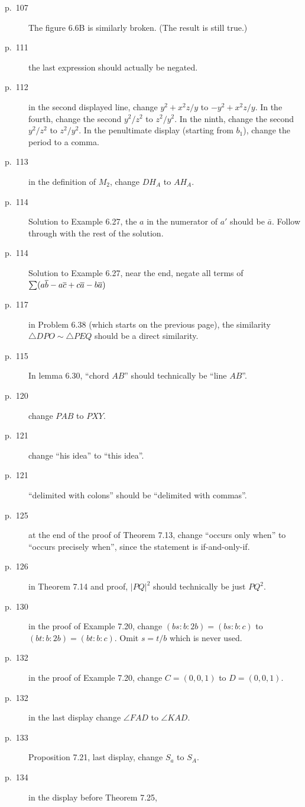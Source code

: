 \documentclass[11pt]{scrartcl}
\begin{document}
\begin{description}
\item[p.\  107] 
  The figure 6.6B is similarly broken.
  (The result is still true.)
\item[p.\  111] the last expression should actually be negated.
\item[p.\  112] in the second displayed line, change $y^2+x^2z/y$ to $-y^2+x^2z/y$.
  In the fourth, change the second $y^2/z^2$ to $z^2/y^2$.
  In the ninth, change the second $y^2/z^2$ to $z^2/y^2$.
  In the penultimate display (starting from $b_1$), change the period to a comma.
\item[p.\  113] in the definition of $M_2$, change $DH_A$ to $AH_A$.
\item[p.\  114] Solution to Example 6.27, the $a$ in the numerator of $a'$ should be $\bar a$.
  Follow through with the rest of the solution.
\item[p.\  114] Solution to Example 6.27, near the end, negate all terms of
  $\sum (a \overline b - a \overline c + c \overline a - b \overline a)$
\item[p.\  117] in Problem 6.38 (which starts on the previous page), the similarity
  $\triangle DPO \sim \triangle PEQ$ should be a direct similarity.
\item[p.\ 115] In lemma 6.30, ``chord $AB$'' should technically be ``line $AB$''.
\item[p.\  120] change $PAB$ to $PXY$.
\item[p.\  121] change ``his idea'' to ``this idea''.
\item[p.\  121] ``delimited with colons'' should be
  ``delimited with commas''.
\item[p.\  125] at the end of the proof of Theorem 7.13,
  change ``occurs only when'' to ``occurs precisely when'',
  since the statement is if-and-only-if.
\item[p.\  126] in Theorem 7.14 and proof, $|PQ|^2$ should technically be just $PQ^2$.
\item[p.\  130] in the proof of Example 7.20, change $(bs:b:2b)=(bs:b:c)$ to $(bt:b:2b)=(bt:b:c)$.
  Omit $s=t/b$ which is never used.
\item[p.\  132] in the proof of Example 7.20, change $C = (0, 0, 1)$ to $D = (0, 0, 1)$.
\item[p.\  132] in the last display change $\angle FAD$ to $\angle KAD$.
\item[p.\  133] Proposition 7.21, last display, change $S_a$ to $S_A$.
\item[p.\  134] in the display before Theorem 7.25,

\end{description}
\end{document}
